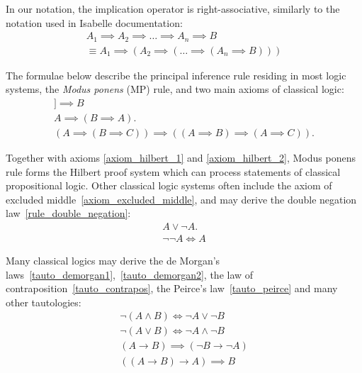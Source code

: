 \documentclass[article]{aaltoseries}
\begin{document}
In our notation, the implication operator is right-associative, similarly to the notation used in Isabelle documentation:
\begin{gather}
A_{1} \implies A_{2} \implies \dots \implies A_{n} \implies B \\
\equiv A_{1} \implies ( A_{2} \implies ( \dots \implies ( A_{n} \implies B)))
\end{gather}


The formulae below describe the principal inference rule residing in most logic systems, the \textit{Modus ponens} (MP) rule, and two main axioms of classical logic:
\begin{gather}
[\![ A, A \implies B ]\!] \implies B
    \label{rule_modus_ponens}\tag{MP} \\
%
A \implies (B \implies A).
	\label{axiom_hilbert_1}\tag{A1} \\
%
(A \implies (B \implies C)) \implies ((A \implies B) \implies (A \implies C)).
	\label{axiom_hilbert_2}\tag{A2}
\end{gather}

Together with axioms \eqref{axiom_hilbert_1} and \eqref{axiom_hilbert_2}, Modus ponens rule forms the Hilbert proof system which can process statements of classical propositional logic.
Other classical logic systems often include the axiom of excluded middle~\eqref{axiom_excluded_middle}, and may derive the double negation law~\eqref{rule_double_negation}:
\begin{gather}
A \lor \neg A.
	\label{axiom_excluded_middle}\tag{EM} \\
%
\neg \neg A \Leftrightarrow A
\label{rule_double_negation}\tag{DN}
\end{gather}

Many classical logics may derive the de Morgan's laws~\eqref{tauto_demorgan1},~\eqref{tauto_demorgan2}, the law of contraposition~\eqref{tauto_contrapos}, the Peirce's law~\eqref{tauto_peirce} and many other tautologies:
\begin{gather}
\neg (A \land B) \Leftrightarrow \neg A \lor \neg B 
    \label{tauto_demorgan1}\tag{DM1} \\
\neg (A \lor B) \Leftrightarrow \neg A \land \neg B 
    \label{tauto_demorgan2}\tag{DM2} \\
(A \rightarrow B) \implies (\neg B \rightarrow \neg A) 
    \label{tauto_contrapos}\tag{CP} \\
((A \rightarrow B) \rightarrow A) \implies B
    \label{tauto_peirce}\tag{Peirce}
\end{gather}
\end{document}
